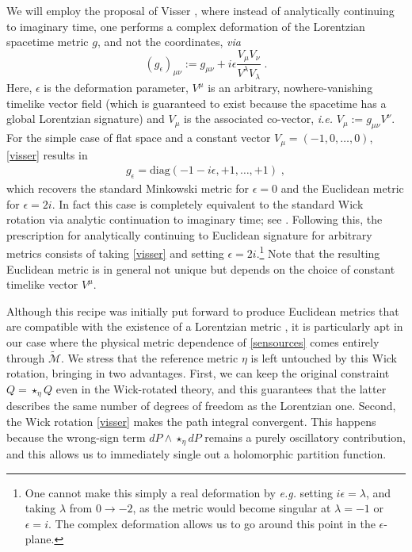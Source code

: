 \documentclass[11pt]{article}
\numberwithin{equation}{section}
\begin{document}
We will employ the proposal of Visser \cite{Visser:2017atf}, where instead of analytically continuing to imaginary time, one performs a complex deformation of the Lorentzian spacetime metric $g$, and not the coordinates, {\it via} 
\begin{equation}\label{visser}
(g_\epsilon)_{\mu\nu}:=g_{\mu\nu}+i\epsilon\frac{V_\mu V_\nu}{V^\lambda V_\lambda}\;.
\end{equation}
Here, $\epsilon$ is the deformation parameter, $V^\mu$ is an arbitrary, nowhere-vanishing timelike vector field (which is guaranteed to exist  because the spacetime has a global Lorentzian signature) and $V_\mu$ is the associated co-vector, \emph{i.e.} $V_\mu:=g_{\mu\nu}V^\nu$. For the simple case of flat space and a constant vector $V_\mu = (-1,0,\ldots,0)$, \eqref{visser} results in
\begin{align}
    g_{\epsilon}=\mathrm{diag}(-1-i \epsilon,+1,\ldots,+1) \;,
\end{align}
which recovers the standard Minkowski metric for $\epsilon = 0$ and the Euclidean metric for  $\epsilon = 2 i $. In fact this case is completely equivalent to the standard Wick rotation via analytic continuation to imaginary time; see \cite{Visser:2017atf}. Following this, the prescription for analytically continuing to Euclidean signature for arbitrary metrics consists of taking \eqref{visser} and setting $\epsilon = 2 i$.\footnote{One cannot make this simply a real deformation by {\em e.g.} setting $i \epsilon = \lambda$, and taking $\lambda$ from $0 \rightarrow -2$, as the metric would become singular at $\lambda = -1$ or $\epsilon = i$. The complex deformation allows us to go around this point in the $\epsilon$-plane.} Note that the resulting Euclidean metric is in general not unique but depends on the choice of constant timelike vector $V^\mu$. 

Although this recipe was initially put forward to produce Euclidean metrics that are compatible with the existence of a Lorentzian metric \cite{Visser:2017atf}, it is particularly apt in our case where the physical metric dependence of \eqref{sensources} comes entirely through $\widetilde{\mathcal M}$. We stress that the reference metric $\eta$ is left untouched by this Wick rotation, bringing in two advantages. First, we can keep the original constraint $Q=\star_\eta Q$ even in the Wick-rotated theory, and this guarantees that the latter describes the same number of degrees of freedom as the Lorentzian one. Second, the Wick rotation \eqref{visser} makes the path integral convergent. This happens because the wrong-sign term $dP\wedge \star_\eta dP$ remains a purely oscillatory contribution, and this allows us to immediately single out a holomorphic partition function.
\end{document}
